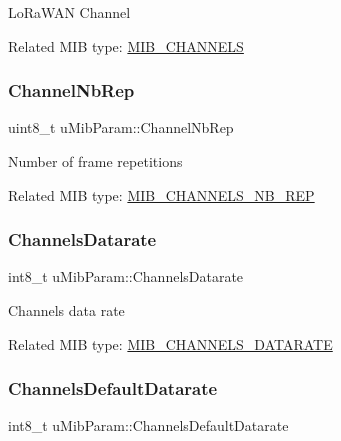 Lo\+Ra\+W\+AN Channel

Related M\+IB type\+: \hyperlink{group__LORAMAC_gga32ea83d13a3f5bb4b3ec2ace2319ab61a0236aae7748c12308383eab208a3cc5a}{M\+I\+B\+\_\+\+C\+H\+A\+N\+N\+E\+LS} \mbox{\label{unionuMibParam_ac25048296416e1ca348d568d539ed946}} 
\subsubsection{\texorpdfstring{Channel\+Nb\+Rep}{ChannelNbRep}}
{\footnotesize\ttfamily uint8\+\_\+t u\+Mib\+Param\+::\+Channel\+Nb\+Rep}

Number of frame repetitions

Related M\+IB type\+: \hyperlink{group__LORAMAC_gga32ea83d13a3f5bb4b3ec2ace2319ab61af8775ceffd8bc73429e43eac205383ea}{M\+I\+B\+\_\+\+C\+H\+A\+N\+N\+E\+L\+S\+\_\+\+N\+B\+\_\+\+R\+EP} \mbox{\label{unionuMibParam_aae0c86fa530e987e280567342ed8181a}} 
\subsubsection{\texorpdfstring{Channels\+Datarate}{ChannelsDatarate}}
{\footnotesize\ttfamily int8\+\_\+t u\+Mib\+Param\+::\+Channels\+Datarate}

Channels data rate

Related M\+IB type\+: \hyperlink{group__LORAMAC_gga32ea83d13a3f5bb4b3ec2ace2319ab61a78f3b4e3ae4ebaacb478073d2a2ec4f1}{M\+I\+B\+\_\+\+C\+H\+A\+N\+N\+E\+L\+S\+\_\+\+D\+A\+T\+A\+R\+A\+TE} \mbox{\label{unionuMibParam_a150339341b4c54a3e0779893c248a559}} 
\subsubsection{\texorpdfstring{Channels\+Default\+Datarate}{ChannelsDefaultDatarate}}
{\footnotesize\ttfamily int8\+\_\+t u\+Mib\+Param\+::\+Channels\+Default\+Datarate}

